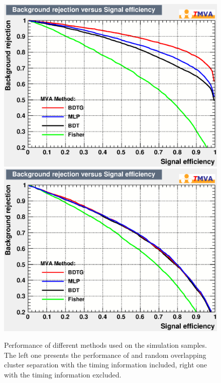\begin{figure}[!htb]
  \begin{center}
    \includegraphics[width=0.49\linewidth]{Figures/06_ECAL/fast_sim/Identification/gamma_combine/with_time/rejBvsS.eps} 
    \includegraphics[width=0.49\linewidth]{Figures/06_ECAL/fast_sim/Identification/gamma_combine/no_time/rejBvsS.eps}
    \vspace*{-0.5cm}
  \end{center}
  \caption{
   Performance of different methods used on the simulation samples.
   The left one presents the performance of \g and random overlapping cluster separation with the timing information included, 
   right one with the timing information excluded.
  }
  \label{fig:identi_gamma_overlapping_ROC}
\end{figure}

